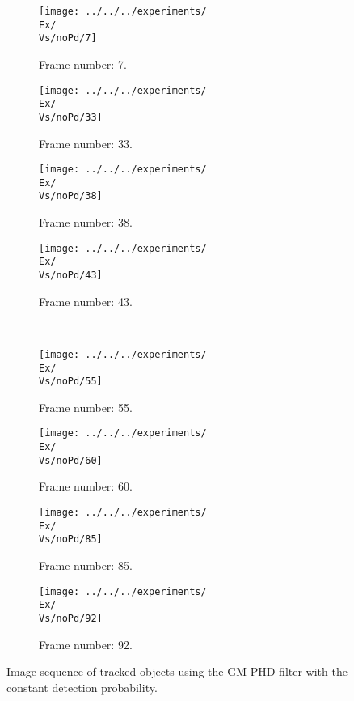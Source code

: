 \begin{figure}[H]
    \centering
    \begin{subfigure}{0.23\textwidth}
        \centering
        \texttt{[image: ../../../experiments/\\Ex/\\Vs/noPd/7]}
        \caption{Frame number: 7.}
        \label{fig:\Ex-\Vs-\Set:01}
    \end{subfigure}
    \begin{subfigure}{0.23\textwidth}
        \centering
        \texttt{[image: ../../../experiments/\\Ex/\\Vs/noPd/33]}
        \caption{Frame number: 33.}
        \label{fig:\Ex-\Vs-\Set:02}
    \end{subfigure}
    \begin{subfigure}{0.23\textwidth}
        \centering
        \texttt{[image: ../../../experiments/\\Ex/\\Vs/noPd/38]}
        \caption{Frame number: 38.}
        \label{fig:\Ex-\Vs-\Set:03}
    \end{subfigure}
    \begin{subfigure}{0.23\textwidth}
        \centering
        \texttt{[image: ../../../experiments/\\Ex/\\Vs/noPd/43]}
        \caption{Frame number: 43.}
        \label{fig:\Ex-\Vs-\Set:04}
    \end{subfigure}
    \\
    \begin{subfigure}{0.23\textwidth}
        \centering
        \texttt{[image: ../../../experiments/\\Ex/\\Vs/noPd/55]}
        \caption{Frame number: 55.}
        \label{fig:\Ex-\Vs-\Set:05}
    \end{subfigure}
    \begin{subfigure}{0.23\textwidth}
        \centering
        \texttt{[image: ../../../experiments/\\Ex/\\Vs/noPd/60]}
        \caption{Frame number: 60.}
        \label{fig:\Ex-\Vs-\Set:06}
    \end{subfigure}
    \begin{subfigure}{0.23\textwidth}
        \centering
        \texttt{[image: ../../../experiments/\\Ex/\\Vs/noPd/85]}
        \caption{Frame number: 85.}
        \label{fig:\Ex-\Vs-\Set:07}
    \end{subfigure}
    \begin{subfigure}{0.23\textwidth}
        \centering
        \texttt{[image: ../../../experiments/\\Ex/\\Vs/noPd/92]}
        \caption{Frame number: 92.}
        \label{fig:\Ex-\Vs-\Set:08}
    \end{subfigure}
    \caption{Image sequence of tracked objects using the GM-PHD filter with the constant detection probability.}
    \label{fig:\Ex-\Vs-\Set}
\end{figure}




